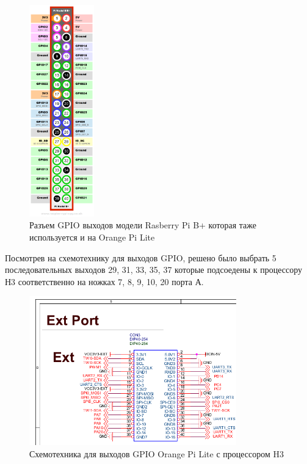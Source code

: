 \begin{figure}[h!]
    \centering
    \includegraphics[width=0.25\textwidth]{Raspberry-Pi-B-Plus.png}
    \caption{Разъем GPIO выходов модели Rasberry Pi B+ которая таже используется и на Orange Pi Lite}
\end{figure}

Посмотрев на схемотехнику для выходов GPIO, решено было выбрать 5 последовательных 
выходов 29, 31, 33, 35, 37 которые подсоедены к процессору Н3 соответственно на ножках 7, 8, 9, 10, 20 порта А. 

\begin{figure}[h!]
    \centering
    \includegraphics[width=0.8\textwidth]{2017-05-09_at_17:08:33_screenshot.png}
    \caption{Схемотехника для выходов GPIO Orange Pi Lite с процессором H3}
\end{figure}


